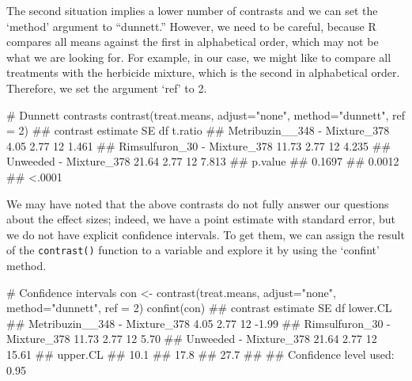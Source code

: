 \documentclass[a4paper,12pt,oneside]{book}
\newenvironment{Shaded}{\begin{snugshade}}{\end{snugshade}}
\newcommand{\DecValTok}[1]{#1}
\newcommand{\StringTok}[1]{#1}
\newcommand{\CommentTok}[1]{#1}
\newcommand{\DocumentationTok}[1]{#1}
\newcommand{\OtherTok}[1]{#1}
\newcommand{\FunctionTok}[1]{#1}
\newcommand{\AttributeTok}[1]{#1}
\newcommand{\NormalTok}[1]{#1}
\begin{document}
\normalsize

The second situation implies a lower number of contrasts and we can set the `method' argument to ``dunnett.'' However, we need to be careful, because R compares all means against the first in alphabetical order, which may not be what we are looking for. For example, in our case, we might like to compare all treatments with the herbicide mixture, which is the second in alphabetical order. Therefore, we set the argument `ref' to 2.

\footnotesize

\begin{Shaded}
\begin{Highlighting}[]
\CommentTok{\# Dunnett contrasts}
\FunctionTok{contrast}\NormalTok{(treat.means, }\AttributeTok{adjust=}\StringTok{"none"}\NormalTok{, }\AttributeTok{method=}\StringTok{"dunnett"}\NormalTok{, }\AttributeTok{ref =} \DecValTok{2}\NormalTok{)}
\DocumentationTok{\#\#  contrast                      estimate   SE df t.ratio}
\DocumentationTok{\#\#  Metribuzin\_\_348 {-} Mixture\_378     4.05 2.77 12 1.461  }
\DocumentationTok{\#\#  Rimsulfuron\_30 {-} Mixture\_378     11.73 2.77 12 4.235  }
\DocumentationTok{\#\#  Unweeded {-} Mixture\_378           21.64 2.77 12 7.813  }
\DocumentationTok{\#\#  p.value}
\DocumentationTok{\#\#  0.1697 }
\DocumentationTok{\#\#  0.0012 }
\DocumentationTok{\#\#  \textless{}.0001}
\end{Highlighting}
\end{Shaded}

\normalsize

We may have noted that the above contrasts do not fully answer our questions about the effect sizes; indeed, we have a point estimate with standard error, but we do not have explicit confidence intervals. To get them, we can assign the result of the \texttt{contrast()} function to a variable and explore it by using the `confint' method.

\begin{Shaded}
\begin{Highlighting}[]
\CommentTok{\# Confidence intervals}
\NormalTok{con }\OtherTok{\textless{}{-}} \FunctionTok{contrast}\NormalTok{(treat.means, }\AttributeTok{adjust=}\StringTok{"none"}\NormalTok{, }
                \AttributeTok{method=}\StringTok{"dunnett"}\NormalTok{, }\AttributeTok{ref =} \DecValTok{2}\NormalTok{)}
\FunctionTok{confint}\NormalTok{(con)}
\DocumentationTok{\#\#  contrast                      estimate   SE df lower.CL}
\DocumentationTok{\#\#  Metribuzin\_\_348 {-} Mixture\_378     4.05 2.77 12    {-}1.99}
\DocumentationTok{\#\#  Rimsulfuron\_30 {-} Mixture\_378     11.73 2.77 12     5.70}
\DocumentationTok{\#\#  Unweeded {-} Mixture\_378           21.64 2.77 12    15.61}
\DocumentationTok{\#\#  upper.CL}
\DocumentationTok{\#\#      10.1}
\DocumentationTok{\#\#      17.8}
\DocumentationTok{\#\#      27.7}
\DocumentationTok{\#\# }
\DocumentationTok{\#\# Confidence level used: 0.95}
\end{Highlighting}
\end{Shaded}
\end{document}
